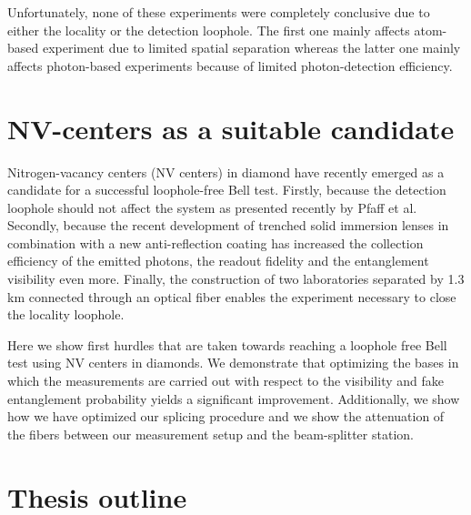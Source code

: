 Unfortunately, none of these experiments were completely conclusive due to either the locality or the detection loophole. The first one mainly affects atom-based experiment due to limited spatial separation whereas the latter one mainly affects photon-based experiments because of limited photon-detection efficiency.  

\color{tudelft-cyan}
\section{NV-centers as a suitable candidate}
\color{black}

Nitrogen-vacancy centers (NV centers) in diamond have recently emerged as a candidate for a successful loophole-free Bell test. Firstly, because the detection loophole should not affect the system as presented recently by Pfaff et al. \cite{pfaff2014unconditional} Secondly, because the recent development of trenched solid immersion lenses in combination with a new anti-reflection coating has increased the collection efficiency of the emitted photons, the readout fidelity and the entanglement visibility even more. Finally, the construction of two laboratories separated by 1.3 km connected through an optical fiber enables the experiment necessary to close the locality loophole.  

Here we show first hurdles that are taken towards reaching a loophole free Bell test using NV centers in diamonds. We demonstrate that optimizing the bases in which the measurements are carried out with respect to the visibility and fake entanglement probability yields a significant improvement. Additionally, we show how we have optimized our splicing procedure and we show the attenuation of the fibers between  our measurement setup and the beam-splitter station.

\color{tudelft-cyan}
\section{Thesis outline}
\color{black}
